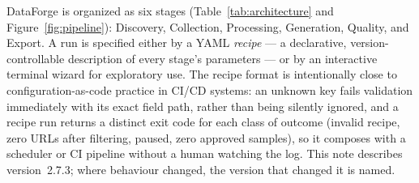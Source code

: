 \documentclass[11pt]{article}
\begin{document}
DataForge is organized as six stages (Table~\ref{tab:architecture} and
Figure~\ref{fig:pipeline}):
Discovery, Collection, Processing, Generation, Quality, and Export. A
run is specified either by a YAML \emph{recipe} --- a declarative,
version-controllable description of every stage's parameters --- or by
an interactive terminal wizard for exploratory use. The recipe format
is intentionally close to configuration-as-code practice in CI/CD
systems: an unknown key fails validation immediately with its exact
field path, rather than being silently ignored, and a recipe run
returns a distinct exit code for each class of outcome (invalid recipe,
zero URLs after filtering, paused, zero approved samples), so it
composes with a scheduler or CI pipeline without a human watching the
log. This note describes version~2.7.3; where behaviour changed, the
version that changed it is named.
\end{document}
